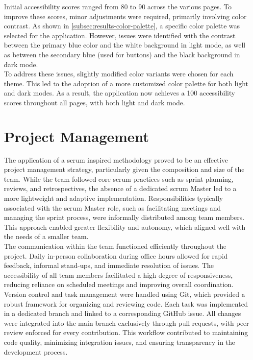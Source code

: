 Initial accessibility scores ranged from 80 to 90 across the various pages. To improve these scores, minor adjustments were required, primarily involving color contrast. As shown in \ref{subsec:results-color-palette}, a specific color palette was selected for the application. However, issues were identified with the contrast between the primary blue color and the white background in light mode, as well as between the secondary blue (used for buttons) and the black background in dark mode. \\

To address these issues, slightly modified color variants were chosen for each theme. This led to the adoption of a more customized color palette for both light and dark modes. As a result, the application now achieves a 100 accessibility scores throughout all pages, with both light and dark mode. 

\section{Project Management}
\label{sec:discussion-project-management}

The application of a \gls{scrum} inspired methodology proved to be an effective project management strategy, particularly given the composition and size of the team. While the team followed core \gls{scrum} practices such as sprint planning, reviews, and retrospectives, the absence of a dedicated \gls{scrum} Master led to a more lightweight and adaptive implementation. Responsibilities typically associated with the \gls{scrum} Master role, such as facilitating meetings and managing the sprint process, were informally distributed among team members. This approach enabled greater flexibility and autonomy, which aligned well with the needs of a smaller team. \\

The communication within the team functioned efficiently throughout the project. Daily in-person collaboration during office hours allowed for rapid feedback, informal stand-ups, and immediate resolution of issues. The accessibility of all team members facilitated a high degree of responsiveness, reducing reliance on scheduled meetings and improving overall coordination.\\

Version control and task management were handled using Git, which provided a robust framework for organizing and reviewing code. Each task was implemented in a dedicated branch and linked to a corresponding GitHub issue. All changes were integrated into the main branch exclusively through pull requests, with peer review enforced for every contribution. This workflow contributed to maintaining code quality, minimizing integration issues, and ensuring transparency in the development process. \\

